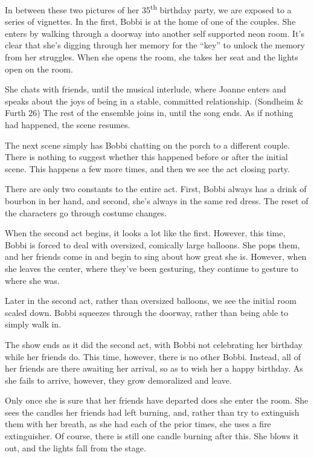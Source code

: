 \documentclass[12pt]{article}[titlepage]
\newcommand{\say}[1]{``#1''}
\newcommand{\1}{\={a}}
\newcommand{\2}{\={e}}
\newcommand{\3}{\={\i}}
\newcommand{\4}{\=o}
\newcommand{\5}{\=u}
\newcommand{\6}{\={A}}
\renewcommand{\,}{\textsuperscript{,}}
\begin{document}
In between these two pictures of her 35\textsuperscript{th} birthday party, we are exposed to a series of vignettes.
In the first, Bobbi is at the home of one of the couples.
She enters by walking through a doorway into another self supported neon room.
It's clear that she's digging through her memory for the \say{key} to unlock the memory from her struggles.
When she opens the room, she takes her seat and the lights open on the room.

She chats with friends, until the musical interlude, where Joanne enters and speaks about the joys of being in a stable, committed relationship. (Sondheim \& Furth 26)
The rest of the ensemble joins in, until the song ends.
As if nothing had happened, the scene resumes.

The next scene simply has Bobbi chatting on the porch to a different couple.
There is nothing to suggest whether this happened before or after the initial scene.
This happens a few more times, and then we see the act closing party.

There are only two constants to the entire act.
First, Bobbi always has a drink of bourbon in her hand, and second, she's always in the same red dress.
The reset of the characters go through costume changes.

When the second act begins, it looks a lot like the first.
However, this time, Bobbi is forced to deal with oversized, comically large balloons.
She pops them, and her friends come in and begin to sing about how great she is.
However, when she leaves the center, where they've been gesturing, they continue to gesture to where she was.

Later in the second act, rather than oversized balloons, we see the initial room scaled down.
Bobbi squeezes through the doorway, rather than being able to simply walk in.

The show ends as it did the second act, with Bobbi not celebrating her birthday while her friends do.
This time, however, there is no other Bobbi.
Instead, all of her friends are there awaiting her arrival, so as to wish her a happy birthday.
As she fails to arrive, however, they grow demoralized and leave.

Only once she is sure that her friends have departed does she enter the room.
She sees the candles her friends had left burning, and, rather than try to extinguish them with her breath, as she had each of the prior times, she uses a fire extinguisher.
Of course, there is still one candle burning after this.
She blows it out, and the lights fall from the stage.
\end{document}
